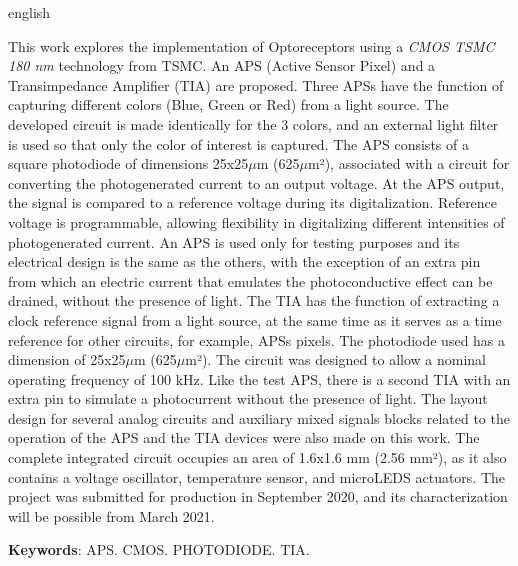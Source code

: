 
\begin{resumo}[Abstract]
 \begin{otherlanguage*}{english}

This work explores the implementation of Optoreceptors using a \textit{CMOS TSMC 180 nm} technology from TSMC. An APS (Active Sensor Pixel) and a Transimpedance Amplifier (TIA) are proposed. Three APSs have the function of capturing different colors (Blue, Green or Red) from a light source. The developed circuit is made identically for the 3 colors, and an external light filter is used so that only the color of interest is captured. The APS consists of a square photodiode of dimensions 25x25$\mu$m (625$\mu$m²), associated with a circuit for converting the photogenerated current to an output voltage. At the APS output, the signal is compared to a reference voltage during its digitalization. Reference voltage is programmable, allowing flexibility in digitalizing different intensities of photogenerated current. An APS is used only for testing purposes and its electrical design is the same as the others, with the exception of an extra pin from which an electric current that emulates the photoconductive effect can be drained, without the presence of light. The TIA has the function of extracting a clock reference signal from a light source, at the same time as it serves as a time reference for other circuits, for example, APSs pixels. The photodiode used has a dimension of 25x25$\mu$m (625$\mu$m²). The circuit was designed to allow a nominal operating frequency of 100 kHz. Like the test APS, there is a second TIA with an extra pin to simulate a photocurrent without the presence of light. The layout design for several analog circuits and auxiliary mixed signals blocks related to the operation of the APS and the TIA devices were also made on this work. The complete integrated circuit occupies an area of 1.6x1.6 mm (2.56 mm²), as it also contains a voltage oscillator, temperature sensor, and microLEDS actuators. The project was submitted for production in September 2020, and its characterization will be possible from March 2021.

   \vspace{\onelineskip}
 
   \noindent 
   \textbf{Keywords}: APS. CMOS. PHOTODIODE. TIA.
 \end{otherlanguage*}
\end{resumo}